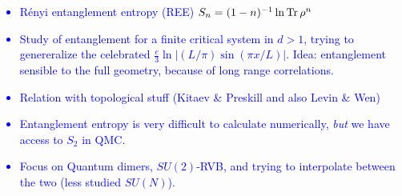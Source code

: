 \documentclass[11pt]{iopart}
\begin{document}
\textcolor{blue}{
\begin{itemize}
\item R\'enyi entanglement entropy (REE) $S_n=(1-n)^{-1}\ln {\rm Tr}\, \rho^n$
 \item Study of entanglement for a finite critical system in $d>1$, trying to genereralize the celebrated $\frac{c}{3}\ln\left| (L/\pi)\sin (\pi x /L)\right|$. Idea: entanglement sensible to the full geometry, because of long range correlations. 
 \item Relation with topological stuff (Kitaev \& Preskill\cite{KP} and also Levin \& Wen\cite{LW})
 \item Entanglement entropy is very difficult to calculate numerically, \emph{but} we have access to $S_2$ in QMC\cite{swap}.
 \item Focus on Quantum dimers, $SU(2)$-RVB, and trying to interpolate between the two (less studied $SU(N)$).
\end{itemize}
}
\end{document}
